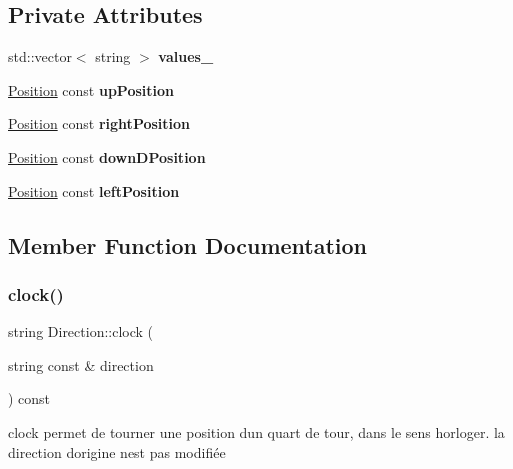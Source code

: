 \subsection*{Private Attributes}
\begin{DoxyCompactItemize}
\item 
\mbox{\label{class_direction_ab74c9dc6d3c512463cb5345571c22a13}} 
std\+::vector$<$ string $>$ {\bfseries values\+\_\+}
\item 
\mbox{\label{class_direction_a7ad1793e678cbab51b22f3d04119bbfa}} 
\mbox{\hyperlink{class_position}{Position}} const {\bfseries up\+Position}
\item 
\mbox{\label{class_direction_ab09a3b078ed61a7e08b0661ba57f32df}} 
\mbox{\hyperlink{class_position}{Position}} const {\bfseries right\+Position}
\item 
\mbox{\label{class_direction_a7a95f3f698b75f944c9beed6d9dd33da}} 
\mbox{\hyperlink{class_position}{Position}} const {\bfseries down\+D\+Position}
\item 
\mbox{\label{class_direction_ab58a1e82e227bd529c1b163361e16739}} 
\mbox{\hyperlink{class_position}{Position}} const {\bfseries left\+Position}
\end{DoxyCompactItemize}


\subsection{Member Function Documentation}
\mbox{\label{class_direction_a89840cc08c0d1e1910a1ce32ab81a42e}} 
\subsubsection{\texorpdfstring{clock()}{clock()}}
{\footnotesize\ttfamily string Direction\+::clock (\begin{DoxyParamCaption}\item[{string const \&}]{direction }\end{DoxyParamCaption}) const}



clock permet de tourner une position d\textquotesingle{}un quart de tour, dans le sens horloger. la direction d\textquotesingle{}origine n\textquotesingle{}est pas modifiée 

